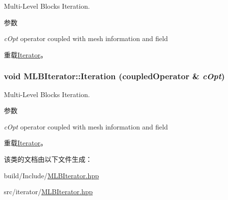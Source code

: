Multi-\/Level Blocks Iteration. 
\begin{DoxyParams}{参数}
\item[{\em cOpt}]operator coupled with mesh information and field \end{DoxyParams}


重载\hyperlink{classIterator_a6f5264776582089c8507dc3fc03a6113}{Iterator}。\hypertarget{classMLBIterator_a05e27d9c7ccc97d8e340a9f7ecba14ff}{
\subsubsection[{Iteration}]{\setlength{\rightskip}{0pt plus 5cm}void MLBIterator::Iteration (coupledOperator \& {\em cOpt})}}
\label{classMLBIterator_a05e27d9c7ccc97d8e340a9f7ecba14ff}


Multi-\/Level Blocks Iteration. 
\begin{DoxyParams}{参数}
\item[{\em cOpt}]operator coupled with mesh information and field \end{DoxyParams}


重载\hyperlink{classIterator_a6f5264776582089c8507dc3fc03a6113}{Iterator}。

该类的文档由以下文件生成：\begin{DoxyCompactItemize}
\item 
build/Include/\hyperlink{build_2Include_2MLBIterator_8hpp}{MLBIterator.hpp}\item 
src/iterator/\hyperlink{src_2iterator_2MLBIterator_8hpp}{MLBIterator.hpp}\end{DoxyCompactItemize}
